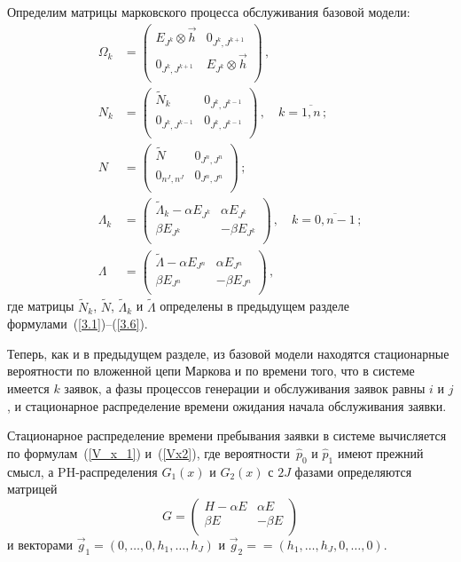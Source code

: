 \begin{multicols}{2}
Определим матрицы марковского процесса обслуживания
базовой модели:
\begin{align*}
\Omega_k &=
\begin{pmatrix}
E_{J^k} \otimes \vec h   &  0_{J^k,J^{k+1}}         \\
0_{J^k,J^{k+1}}          &  E_{J^k} \otimes \vec h  \\
\end{pmatrix}\,,\\
N_k &=
\begin{pmatrix}
\tilde N_k       &  0_{J^k,J^{k-1}}  \\
0_{J^k,J^{k-1}}  &  0_{J^k,J^{k-1}}  \\
\end{pmatrix}\,,
\quad k=\overline{1,n}\,;\\
N &=
\begin{pmatrix}
\tilde N         &  0_{J^n,J^n}  \\
0_{n^J,n^J}      &  0_{J^n,J^n}  \\
\end{pmatrix}\,;\\
\Lambda_k &=
\begin{pmatrix}
\tilde \Lambda_k - \alpha E_{J^k}    &    \alpha E_{J^k}   \\
\beta E_{J^k}                        &    - \beta E_{J^k}  \\
\end{pmatrix}\,,
\quad k=\overline{0,n-1}\,;\\
\Lambda &=
\begin{pmatrix}
\tilde \Lambda - \alpha E_{J^n}   &    \alpha E_{J^n}  \\
\beta E_{J^n}                     &    - \beta E_{J^n} \\
\end{pmatrix}\,,
\end{align*}
где матрицы $\tilde N_k$, $\tilde N$, $\tilde \Lambda_k$ и
$\tilde \Lambda$ определены в предыдущем разделе
формулами~(\ref{3.1})--(\ref{3.6}).

Теперь, как и в предыдущем разделе, из базовой модели
находятся стационарные вероятности по вложенной цепи Маркова
и по времени того, что в системе имеется $k$ заявок, а фазы
процессов генерации и обслуживания заявок равны $i$ и $j$, и
стационарное распределение времени ожидания начала обслуживания
заявки.

Стационарное распределение времени пребывания заявки в системе
вы\-чис\-ля\-ет\-ся по формулам~(\ref{V_x_1}) и~(\ref{Vx2}),
где вероятности~$\hat p_0$ и $\hat p_1$ имеют прежний смысл,
а PH-распределения $G_1(x)$ и $G_2(x)$ с $2J$ фазами
определяются матрицей
$$
G=
\begin{pmatrix}
H-\alpha E       &  \alpha E       \\
\beta E          &  - \beta E      \\
\end{pmatrix}
$$
и векторами $\vec g_1 = (0,\ldots,0,h_1,\ldots, h_J)$ и
$\vec g_2 = $\linebreak $=(h_1,\ldots, h_J,0,\ldots,0)$.


\end{multicols}
